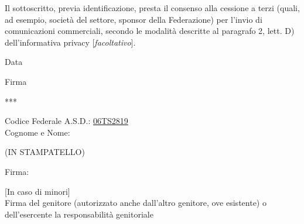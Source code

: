 \documentclass{djts}
\begin{document}
	Il sottoscritto, previa identificazione, presta il consenso alla cessione a terzi (quali, ad esempio, società del settore, sponsor della Federazione) per l'invio di comunicazioni commerciali, secondo le modalità descritte al paragrafo 2, lett. D) dell'informativa privacy [\textit{facoltativo}].
	\begin{center}
		\begin{minipage}{0.4\linewidth}
			\centering
			Data \\[5pt]
		\end{minipage}
		\begin{minipage}{0.4\linewidth}
			\centering
			Firma \\[5pt]
		\end{minipage}
	\end{center}
	
	\begin{center}
		\vspace{0.3in}
		***
		\vspace{0.3in}
	\end{center}
	
	\begin{minipage}{0.7\linewidth}
		Codice Federale A.S.D.: \underline{\hspace{2cm}06TS2819\hspace{2cm}} \\[10pt]
		Cognome e Nome: \fieldfill
		\begin{center}
			(IN STAMPATELLO)
		\end{center}
		Firma: \fieldfill
	\end{minipage}
	
	\vspace{0.5in}
	[In caso di minori] \\[10pt]
	Firma del genitore (autorizzato anche dall'altro genitore, ove esistente) o dell'esercente la responsabilità genitoriale \\[20pt]
	\field{8cm}
	
	
\end{document}

